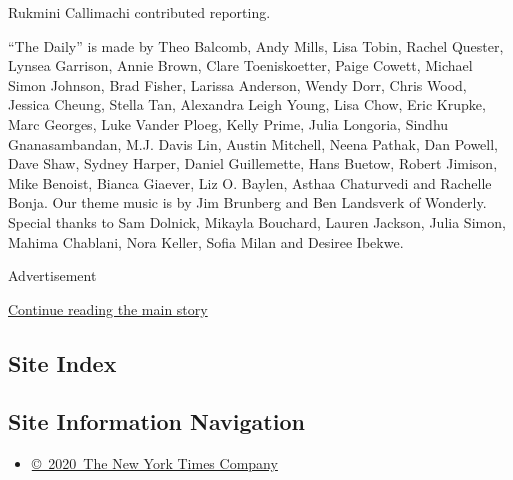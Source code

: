 Rukmini Callimachi contributed reporting.

``The Daily'' is made by Theo Balcomb, Andy Mills, Lisa Tobin, Rachel
Quester, Lynsea Garrison, Annie Brown, Clare Toeniskoetter, Paige
Cowett, Michael Simon Johnson, Brad Fisher, Larissa Anderson, Wendy
Dorr, Chris Wood, Jessica Cheung, Stella Tan, Alexandra Leigh Young,
Lisa Chow, Eric Krupke, Marc Georges, Luke Vander Ploeg, Kelly Prime,
Julia Longoria, Sindhu Gnanasambandan, M.J. Davis Lin, Austin Mitchell,
Neena Pathak, Dan Powell, Dave Shaw, Sydney Harper, Daniel Guillemette,
Hans Buetow, Robert Jimison, Mike Benoist, Bianca Giaever, Liz O.
Baylen, Asthaa Chaturvedi and Rachelle Bonja. Our theme music is by Jim
Brunberg and Ben Landsverk of Wonderly. Special thanks to Sam Dolnick,
Mikayla Bouchard, Lauren Jackson, Julia Simon, Mahima Chablani, Nora
Keller, Sofia Milan and Desiree Ibekwe.

Advertisement

\protect\hyperlink{after-bottom}{Continue reading the main story}

\hypertarget{site-index}{%
\subsection{Site Index}\label{site-index}}

\hypertarget{site-information-navigation}{%
\subsection{Site Information
Navigation}\label{site-information-navigation}}

\begin{itemize}
\tightlist
\item
  \href{https://help.nytimes3xbfgragh.onion/hc/en-us/articles/115014792127-Copyright-notice}{©~2020~The
  New York Times Company}
\end{itemize}

